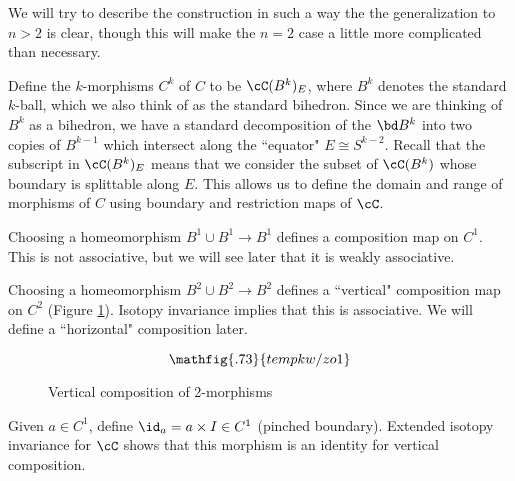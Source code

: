 We will try to describe the construction in such a way the the generalization to $n>2$ is clear,
though this will make the $n=2$ case a little more complicated than necessary.



Define the $k$-morphisms $C^k$ of $C$ to be $\cC(B^k)_E$, where $B^k$ denotes the standard
$k$-ball, which we also think of as the standard bihedron.
Since we are thinking of $B^k$ as a bihedron, we have a standard decomposition of the $\bd B^k$
into two copies of $B^{k-1}$ which intersect along the ``equator" $E \cong S^{k-2}$.
Recall that the subscript in $\cC(B^k)_E$ means that we consider the subset of $\cC(B^k)$
whose boundary is splittable along $E$.
This allows us to define the domain and range of morphisms of $C$ using
boundary and restriction maps of $\cC$.

Choosing a homeomorphism $B^1\cup B^1 \to B^1$ defines a composition map on $C^1$.
This is not associative, but we will see later that it is weakly associative.

Choosing a homeomorphism $B^2\cup B^2 \to B^2$ defines a ``vertical" composition map 
on $C^2$ (Figure \ref{fzo1}).
Isotopy invariance implies that this is associative.
We will define a ``horizontal" composition later.

\begin{figure}[t]
\begin{equation*}
\mathfig{.73}{tempkw/zo1}
\end{equation*}
\caption{Vertical composition of 2-morphisms}
\label{fzo1}
\end{figure}

Given $a\in C^1$, define $\id_a = a\times I \in C^1$ (pinched boundary).
Extended isotopy invariance for $\cC$ shows that this morphism is an identity for 
vertical composition.

